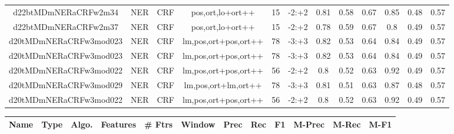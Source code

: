 \documentclass[a4paper]{article}
\begin{document}
\begin{landscape}
\begin{center}
\begin{tabular}{ |c|c|c|c|c|c|c|c|c|c|c|c|}
 
 	
 	\small{ d22btMDmNERaCRFw2m34 } & \small{ NER} & \small{  CRF }  & pos,ort,lo+ort++  &  15 &  \small{  -2:+2 }  &  0.81 & 0.58 & 0.67  &  0.85 & 0.48 & 0.57 \\
 	

 
 	
 	\small{ d22btMDmNERaCRFw2m37 } & \small{ NER} & \small{  CRF }  & pos,ort,lo+ort++  &  15 &  \small{  -2:+2 }  &  0.78 & 0.59 & 0.67  &  0.8 & 0.49 & 0.57 \\
 	

 
 	
 	\small{ d20tMDmNERaCRFw3mod023 } & \small{ NER} & \small{  CRF }  & lm,pos,ort+pos,ort++  &  78 &  \small{  -3:+3 }  &  0.82 & 0.53 & 0.64  &  0.84 & 0.49 & 0.57 \\
 	

 
 	
 	\small{ d20tMDmNERaCRFw3mod023 } & \small{ NER} & \small{  CRF }  & lm,pos,ort+pos,ort++  &  78 &  \small{  -3:+3 }  &  0.82 & 0.53 & 0.64  &  0.84 & 0.49 & 0.57 \\
 	

 
 	
 	\small{ d20tMDmNERaCRFw3mod022 } & \small{ NER} & \small{  CRF }  & lm,pos,ort+pos,ort++  &  56 &  \small{  -2:+2 }  &  0.8 & 0.52 & 0.63  &  0.92 & 0.49 & 0.57 \\
 	

 
 	
 	\small{ d20tMDmNERaCRFw3mod029 } & \small{ NER} & \small{  CRF }  & lm,pos,ort+lm,ort++  &  78 &  \small{  -3:+3 }  &  0.81 & 0.51 & 0.63  &  0.87 & 0.48 & 0.57 \\
 	

 
 	
 	\small{ d20tMDmNERaCRFw3mod022 } & \small{ NER} & \small{  CRF }  & lm,pos,ort+pos,ort++  &  56 &  \small{  -2:+2 }  &  0.8 & 0.52 & 0.63  &  0.92 & 0.49 & 0.57 \\
 	
 \hline
\end{tabular}
\end{center}




\begin{center}
\begin{tabular}{ |c|c|c|c|c|c|c|c|c|c|c|c|} 
 \hline
 	Name & Type & Algo. & Features & \# Ftrs & Window & Prec & Rec & F1 & M-Prec & M-Rec & M-F1\\
 \hline

 	

 
 	

\end{tabular}
\end{center}
\end{landscape}
\end{document}
